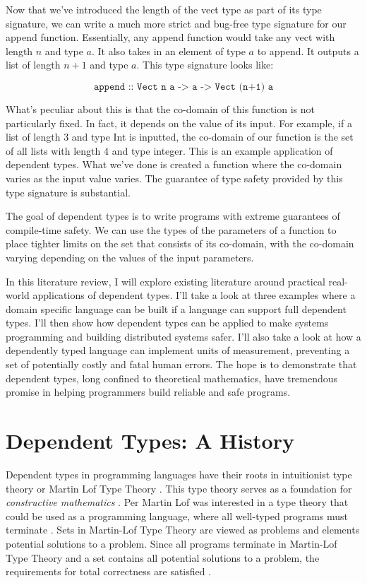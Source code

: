 Now that we've introduced the length of the vect type as part of its type
signature, we can write a much more strict and bug-free type signature for our
append function. Essentially, any append function would take any vect with
length $n$ and type $a$. It also takes in an element of type $a$ to append. It
outputs a list of length $n+1$ and type $a$. This type signature looks like: 

$$
\texttt{append :: Vect n a -> a -> Vect (n+1) a} 
$$

What's peculiar about this is that the co-domain of this function is not
particularly fixed. In fact, it depends on the value of its input. For example,
if a list of length 3 and type Int is inputted, the co-domain of our function is
the set of all lists with length 4 and type integer. This is an example
application of dependent types. What we've done is created a function where the
co-domain varies as the input value varies. The guarantee of type safety
provided by this type signature is substantial. 

The goal of dependent types is to write programs with extreme guarantees of
compile-time safety. We can use the types of the parameters of a function to
place tighter limits on the set that consists of its co-domain, with the
co-domain varying depending on the values of the input parameters. 

In this literature review, I will explore existing literature around practical
real-world applications of dependent types. I'll take a look at three examples
where a domain specific language can be built if a language can support full
dependent types. I'll then show how dependent types can be applied to make
systems programming and building distributed systems safer. I'll also take a
look at how a dependently typed language can implement units of measurement,
preventing a set of potentially costly and fatal human errors. The hope is to
demonstrate that dependent types, long confined to theoretical mathematics, have
tremendous promise in helping programmers build reliable and safe programs. 

\section{Dependent Types: A History}
Dependent types in programming languages have their roots in intuitionist type
theory or Martin Lof Type Theory \cite{martin_lof}. This type theory serves as a
foundation for \textit{constructive mathematics} \cite{constructive_math}. Per Martin
Lof was interested in a type theory that could be used as a programming
language, where all well-typed programs must terminate \cite{intro_martin_lof}.
Sets in Martin-Lof Type Theory are viewed as problems and elements potential
solutions to a problem. Since all programs terminate in Martin-Lof Type Theory
and a set contains all potential solutions to a problem, the requirements for
total correctness are satisfied \cite{intro_martin_lof}.

